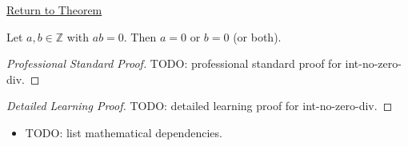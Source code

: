 \newpage
{}
\label{prf:int-no-zero-div}

\begin{remark*}[Return]
\hyperref[prop:int-no-zero-div]{Return to Theorem}
\end{remark*}

\begin{proposition*}
Let $a, b \in \mathbb{Z}$ with $ab = 0$. Then $a = 0$ or $b = 0$ (or both).
\end{proposition*}

\begin{proof}[Professional Standard Proof]
\LRAProofBodyStart
TODO: professional standard proof for int-no-zero-div.
\end{proof}

\begin{proof}[Detailed Learning Proof]
\LRAProofBodyStart
TODO: detailed learning proof for int-no-zero-div.
\end{proof}

\begin{remark*}
\end{remark*}

\begin{dependencies}
\begin{itemize}
  \item TODO: list mathematical dependencies.
\end{itemize}
\end{dependencies}

\clearpage
